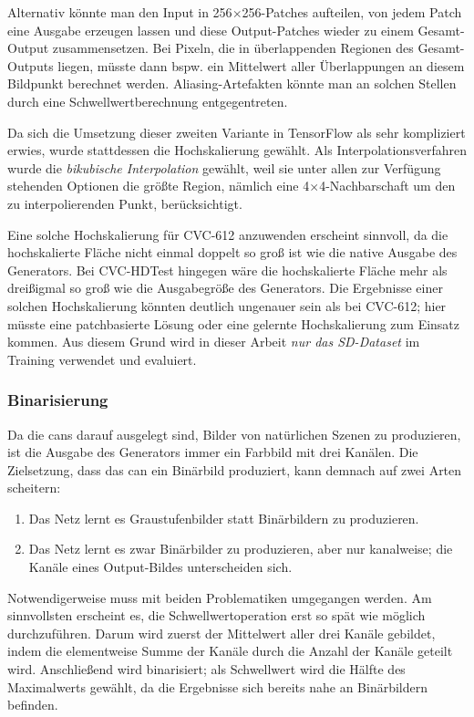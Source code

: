 Alternativ könnte man den Input in 256$\times$256-Patches aufteilen, von jedem Patch eine Ausgabe erzeugen lassen und diese Output-Patches wieder zu einem Gesamt-Output zusammensetzen.
Bei Pixeln, die in überlappenden Regionen des Gesamt-Outputs liegen, müsste dann bspw. ein Mittelwert aller Überlappungen an diesem Bildpunkt berechnet werden.
Aliasing-Artefakten könnte man an solchen Stellen durch eine Schwellwertberechnung entgegentreten.

Da sich die Umsetzung dieser zweiten Variante in TensorFlow als sehr kompliziert erwies, wurde stattdessen die Hochskalierung gewählt.
Als Interpolationsverfahren wurde die \emph{bikubische Interpolation} gewählt, weil sie unter allen zur Verfügung stehenden Optionen die größte Region, nämlich eine 4$\times$4-Nachbarschaft um den zu interpolierenden Punkt, berücksichtigt.

Eine solche Hochskalierung für CVC-612 anzuwenden erscheint sinnvoll, da die hochskalierte Fläche nicht einmal doppelt so groß ist wie die native Ausgabe des Generators.
Bei CVC-HDTest hingegen wäre die hochskalierte Fläche mehr als dreißigmal so groß wie die Ausgabegröße des Generators.
Die Ergebnisse einer solchen Hochskalierung könnten deutlich ungenauer sein als bei CVC-612; hier müsste eine patchbasierte Lösung oder eine gelernte Hochskalierung zum Einsatz kommen.
Aus diesem Grund wird in dieser Arbeit \emph{nur das SD-Dataset} im Training verwendet und evaluiert.



\subsubsection{Binarisierung}

Da die \glspl{can} darauf ausgelegt sind, Bilder von natürlichen Szenen zu produzieren, ist die Ausgabe des Generators immer ein Farbbild mit drei Kanälen.
Die Zielsetzung, dass das \gls{can} ein Binärbild produziert, kann demnach auf zwei Arten scheitern:

\begin{enumerate}
	\item Das Netz lernt es Graustufenbilder statt Binärbildern zu produzieren.
	\item Das Netz lernt es zwar Binärbilder zu produzieren, aber nur kanalweise; die Kanäle eines Output-Bildes unterscheiden sich.
\end{enumerate}

Notwendigerweise muss mit beiden Problematiken umgegangen werden.
Am sinnvollsten erscheint es, die Schwellwertoperation erst so spät wie möglich durchzuführen.
Darum wird zuerst der Mittelwert aller drei Kanäle gebildet, indem die elementweise Summe der Kanäle durch die Anzahl der Kanäle geteilt wird.
Anschließend wird binarisiert; als Schwellwert wird die Hälfte des Maximalwerts gewählt, da die Ergebnisse sich bereits nahe an Binärbildern befinden.

